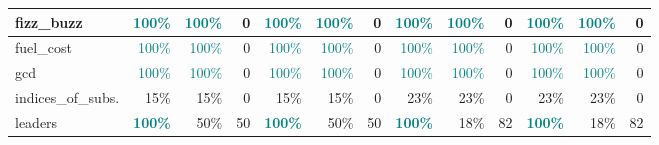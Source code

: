 \begin{table}[!h]
{\begin{tabular}{|p{2.9cm}|rr|r|rr|r||rr|r|rr|r|}
		fizz\_buzz         & \textcolor{teal}{100\%}          & \multicolumn{1}{r|}{\textcolor{teal}{100\%}}          & \cellcolor[HTML]{FFFFFF}0   & \textcolor{teal}{100\%}          & \multicolumn{1}{r|}{\textcolor{teal}{100\%}}          & \cellcolor[HTML]{FFFFFF}0   & \textcolor{teal}{100\%}     & \multicolumn{1}{r|}{\textcolor{teal}{100\%}} & \cellcolor[HTML]{FFFFFF}0    & \textcolor{teal}{100\%}          & \multicolumn{1}{r|}{\textcolor{teal}{100\%}}          & \cellcolor[HTML]{FFFFFF}0    \\ \hline
		fuel\_cost         & \textcolor{teal}{100\%}          & \multicolumn{1}{r|}{\textcolor{teal}{100\%}}          & \cellcolor[HTML]{FFFFFF}0   & \textcolor{teal}{100\%}          & \multicolumn{1}{r|}{\textcolor{teal}{100\%}}          & \cellcolor[HTML]{FFFFFF}0   & \textcolor{teal}{100\%}     & \multicolumn{1}{r|}{\textcolor{teal}{100\%}} & \cellcolor[HTML]{FFFFFF}0    & \textcolor{teal}{100\%}          & \multicolumn{1}{r|}{\textcolor{teal}{100\%}}          & \cellcolor[HTML]{FFFFFF}0    \\ \hline
		gcd                & \textcolor{teal}{100\%}          & \multicolumn{1}{r|}{\textcolor{teal}{100\%}}          & \cellcolor[HTML]{FFFFFF}0   & \textcolor{teal}{100\%}          & \multicolumn{1}{r|}{\textcolor{teal}{100\%}}          & \cellcolor[HTML]{FFFFFF}0   & \textcolor{teal}{100\%}     & \multicolumn{1}{r|}{\textcolor{teal}{100\%}} & \cellcolor[HTML]{FFFFFF}0    & \textcolor{teal}{100\%}          & \multicolumn{1}{r|}{\textcolor{teal}{100\%}}          & \cellcolor[HTML]{FFFFFF}0    \\ \hline
		indices\_of\_subs. & 15\%                             & \multicolumn{1}{r|}{15\%}                             & \cellcolor[HTML]{FFFFFF}0   & 15\%                             & \multicolumn{1}{r|}{15\%}                             & \cellcolor[HTML]{FFFFFF}0   & 23\%                        & \multicolumn{1}{r|}{23\%}                    & \cellcolor[HTML]{FFFFFF}0    & 23\%                             & \multicolumn{1}{r|}{23\%}                             & \cellcolor[HTML]{FFFFFF}0    \\ \hline
		leaders            & \textcolor{teal}{\textbf{100\%}} & \multicolumn{1}{r|}{50\%}                             & \cellcolor[HTML]{FFCC80}50  & \textcolor{teal}{\textbf{100\%}} & \multicolumn{1}{r|}{50\%}                             & \cellcolor[HTML]{FFCC80}50  & \textcolor{teal}{\textbf{100\%}}     & \multicolumn{1}{r|}{18\%}                    & \cellcolor[HTML]{FFAC2E}82   & \textcolor{teal}{\textbf{100\%}} & \multicolumn{1}{r|}{18\%}                             & \cellcolor[HTML]{FFAC2E}82   \\ \hline

\end{tabular}}
\end{table}
